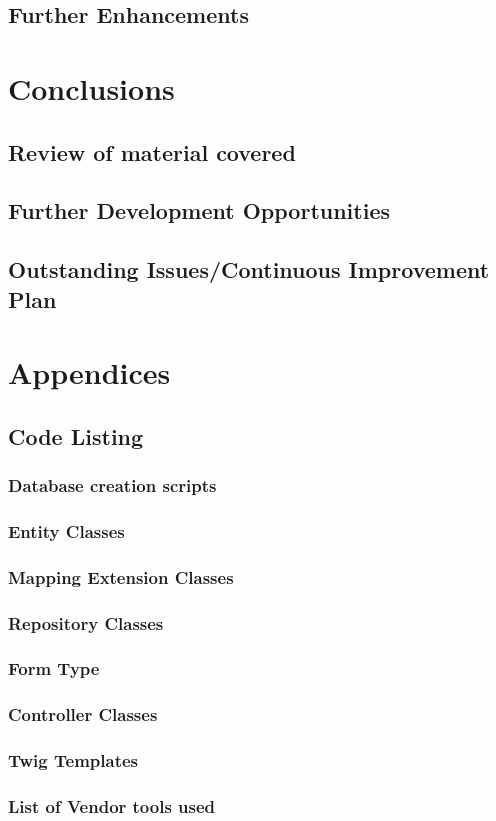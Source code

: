 \documentclass[a4paper,12pt]{article}
\begin{document}
\subsection {Further Enhancements}
\section {Conclusions}
\subsection {Review of material covered }
\subsection {Further Development Opportunities}
\subsection {Outstanding Issues/Continuous Improvement Plan}


\section {Appendices}
\subsection {Code Listing}

\subsubsection {Database creation scripts}
\subsubsection {Entity Classes}
\subsubsection {Mapping Extension Classes}
\subsubsection {Repository Classes}
\subsubsection {Form Type}
\subsubsection {Controller Classes}
\subsubsection {Twig Templates}
\subsubsection {List of Vendor tools used}
\newpage\printbibliography[title={Bibliography}]
\end{document}
